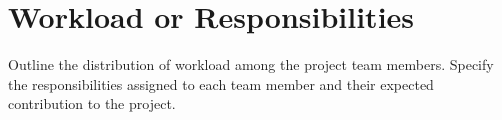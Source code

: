 \section{Workload or Responsibilities}
\label{sec:workload}
Outline the distribution of workload among the project team members. Specify the responsibilities assigned to each team member and their expected contribution to the project.

